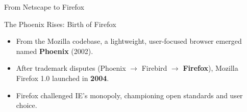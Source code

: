 \documentclass{beamer}
\begin{document}
\begin{frame}[t]{From Netscape to Firefox}
\begin{block}{The Phoenix Rises: Birth of Firefox}
\begin{itemize}
    \item From the Mozilla codebase, a lightweight, user-focused browser emerged named \textbf{Phoenix} (2002).
    \item After trademark disputes (Phoenix $\rightarrow$ Firebird $\rightarrow$ \textbf{Firefox}), Mozilla Firefox 1.0 launched in \textbf{2004}.
    \item Firefox challenged IE's monopoly, championing open standards and user choice.
\end{itemize}
\end{block}

\end{frame}
\end{document}
